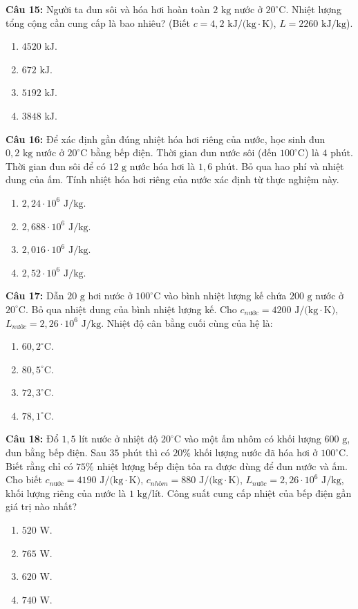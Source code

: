 \documentclass[12pt,a4paper]{article}
\begin{document}
\textbf{Câu 15:} Người ta đun sôi và hóa hơi hoàn toàn $2\text{ kg}$ nước ở $20^{\circ}\text{C}$. Nhiệt lượng tổng cộng cần cung cấp là bao nhiêu? (Biết $c = 4{,}2\text{ kJ/(kg}\cdot\text{K)}$, $L = 2260\text{ kJ/kg}$).
\begin{enumerate}[label=\Alph*.]
  \item $4520\text{ kJ}$.
  \item $672\text{ kJ}$.
  \item $5192\text{ kJ}$.
  \item $3848\text{ kJ}$.
\end{enumerate}

\textbf{Câu 16:} Để xác định gần đúng nhiệt hóa hơi riêng của nước, học sinh đun $0{,}2\text{ kg}$ nước ở $20^{\circ}\text{C}$ bằng bếp điện. Thời gian đun nước sôi (đến $100^{\circ}\text{C}$) là $4\text{ phút}$. Thời gian đun sôi để có $12\text{ g}$ nước hóa hơi là $1{,}6\text{ phút}$. Bỏ qua hao phí và nhiệt dung của ấm. Tính nhiệt hóa hơi riêng của nước xác định từ thực nghiệm này.
\begin{enumerate}[label=\Alph*.]
  \item $2{,}24 \cdot 10^6\text{ J/kg}$.
  \item $2{,}688 \cdot 10^6\text{ J/kg}$.
  \item $2{,}016 \cdot 10^6\text{ J/kg}$.
  \item $2{,}52 \cdot 10^6\text{ J/kg}$.
\end{enumerate}

\textbf{Câu 17:} Dẫn $20\text{ g}$ hơi nước ở $100^{\circ}\text{C}$ vào bình nhiệt lượng kế chứa $200\text{ g}$ nước ở $20^{\circ}\text{C}$. Bỏ qua nhiệt dung của bình nhiệt lượng kế. Cho $c_{nước} = 4200\text{ J/(kg}\cdot\text{K)}$, $L_{nước} = 2{,}26 \cdot 10^6\text{ J/kg}$. Nhiệt độ cân bằng cuối cùng của hệ là:
\begin{enumerate}[label=\Alph*.]
  \item $60{,}2^{\circ}\text{C}$.
  \item $80{,}5^{\circ}\text{C}$.
  \item $72{,}3^{\circ}\text{C}$.
  \item $78{,}1^{\circ}\text{C}$.
\end{enumerate}

\textbf{Câu 18:} Đổ $1{,}5\text{ lít}$ nước ở nhiệt độ $20^{\circ}\text{C}$ vào một ấm nhôm có khối lượng $600\text{ g}$, đun bằng bếp điện. Sau $35\text{ phút}$ thì có $20\%$ khối lượng nước đã hóa hơi ở $100^{\circ}\text{C}$. Biết rằng chỉ có $75\%$ nhiệt lượng bếp điện tỏa ra được dùng để đun nước và ấm. Cho biết $c_{nước} = 4190\text{ J/(kg}\cdot\text{K)}$, $c_{nhôm} = 880\text{ J/(kg}\cdot\text{K)}$, $L_{nước} = 2{,}26 \cdot 10^6\text{ J/kg}$, khối lượng riêng của nước là $1\text{ kg/lít}$. Công suất cung cấp nhiệt của bếp điện gần giá trị nào nhất?
\begin{enumerate}[label=\Alph*.]
  \item $520\text{ W}$.
  \item $765\text{ W}$.
  \item $620\text{ W}$.
  \item $740\text{ W}$.
\end{enumerate}
\end{document}
